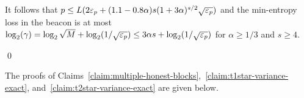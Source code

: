 It follows that 
$p \leq L (2 \mathsf{\varepsilon}_p + (1.1 - 0.8 \alpha) s (1+3\alpha)^{s/2} \sqrt{\mathsf{\varepsilon}_p} )$ 
and 
the min-entropy loss in the beacon is at most 
$
  \log_2(\gamma) 
  = \log_2 \sqrt{M} + \log_2(1/\sqrt{\mathsf{\varepsilon}_p})
  \leq 3 \alpha s + \log_2(1/\sqrt{\mathsf{\varepsilon}_p}) 
$ 
for $\alpha \geq 1/3$ and $s \geq 4$. 









\hfill\qed

The proofs of Claims~\ref{claim:multiple-honest-blocks},~\ref{claim:t1star-variance-exact}, 
and~\ref{claim:t2star-variance-exact} 
are given below.




